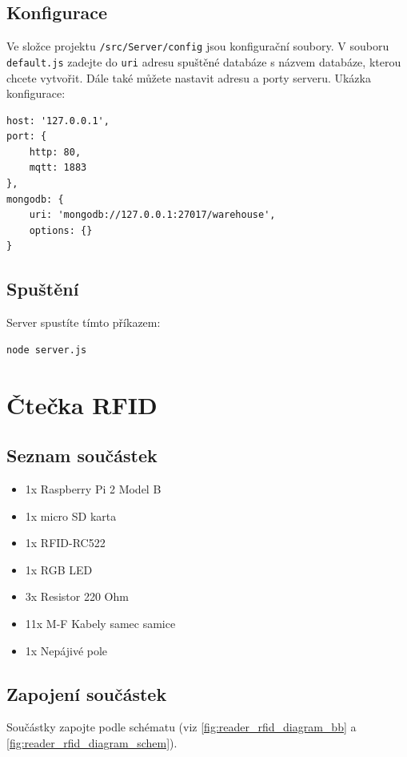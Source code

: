 \documentclass[czech,BP]{thesiskiv}
\begin{document}
\subsection{Konfigurace}
Ve složce projektu \texttt{/src/Server/config} jsou konfigurační soubory. 
V souboru \texttt{default.js} zadejte do \texttt{uri} adresu spuštěné databáze s názvem databáze, kterou chcete vytvořit.
Dále také můžete nastavit adresu a porty serveru. Ukázka konfigurace:
 
\begin{verbatim}
host: '127.0.0.1',
port: {
    http: 80,
    mqtt: 1883
},
mongodb: {
    uri: 'mongodb://127.0.0.1:27017/warehouse',
    options: {}
}
\end{verbatim}

\subsection{Spuštění}

Server spustíte tímto příkazem:
\begin{verbatim}
node server.js
\end{verbatim}


\section{Čtečka RFID}
	
\subsection{Seznam součástek}
\begin{itemize}
\item 1x Raspberry Pi 2 Model B
\item 1x micro SD karta 
\item 1x RFID-RC522 
\item 1x RGB LED  
\item 3x Resistor 220 Ohm 
\item 11x M-F Kabely samec samice
\item 1x Nepájivé pole
\end{itemize}

\newpage
\subsection{Zapojení součástek}

Součástky zapojte podle schématu (viz \ref{fig:reader_rfid_diagram_bb} a \ref{fig:reader_rfid_diagram_schem}).
\end{document}
